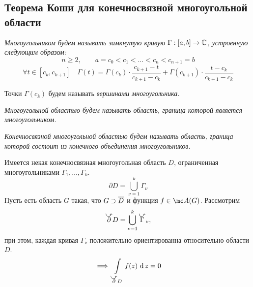 \subsection{Теорема Коши для конечносвязной многоугольной области}

\begin{definition}
	\it{Многоугольником} будем называть замкнутую кривую $ \Gamma : [a, b] \to \mathbb{C} $, устроенную следующим образом:
	$$ n \ge 2, \qquad a = c_0 < c_1 < \dots < c_n < c_{n + 1} = b $$
	$$ \forall t \in [c_k, c_{k + 1}] \quad \Gamma(t) = \Gamma(c_k) \cdot \frac{c_{k + 1} - t}{c_{k + 1} - c_k} + \Gamma(c_{k + 1}) \cdot \frac{t - c_k}{c_{k + 1} - c_k} $$

	Точки $ \Gamma(c_k) $ будем называть \it{вершинами} многоугольника.
\end{definition}

\begin{definition}
	\it{Многоугольной областью} будем называть область, граница которой является многоугольником.
\end{definition}

\begin{definition}
	\it{Конечносвязной многоугольной областью} будем называть область, граница которой состоит из конечного объединения многоугольников.
\end{definition}

\begin{theorem}
	Имеется некая конечносвязная многоугольная область $ D $, ограниченная многоугольниками $ \Gamma_1, \dots, \Gamma_k $.
	$$ \partial D = \bigcup_{\nu = 1}^k \Gamma_\nu $$
	Пусть есть область $ G $ такая, что $ G \supset \overline D $ и функция $ f \in \mc A(G) $. Рассмотрим
	$$ \curvedir \partial D = \bigcup_{\nu = 1}^k \curvedir \Gamma_\nu, $$
	при этом, каждая кривая $ \Gamma_\nu $ положительно ориентированна относительно области $ D $.
	$$ \implies \cint[z]{\curvedir\partial D}{f(z)} = 0 $$
\end{theorem}


